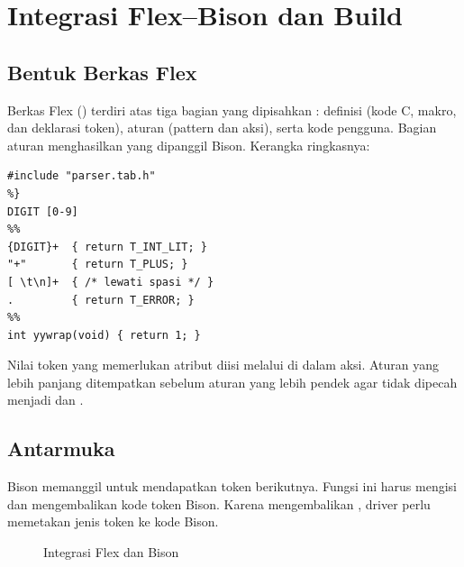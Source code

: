 \section{Integrasi Flex--Bison dan Build}
\label{sec:ch13-integrasi}

\subsection{Bentuk Berkas Flex}

Berkas Flex () terdiri atas tiga bagian yang dipisahkan
\code{\%\%}: definisi (kode C, makro, dan deklarasi token), aturan
(pattern dan aksi), serta kode pengguna. Bagian aturan menghasilkan
 yang dipanggil Bison. Kerangka ringkasnya:

\begin{lstlisting}[language=Flex]
%{
#include "parser.tab.h"
%}
DIGIT [0-9]
%%
{DIGIT}+  { return T_INT_LIT; }
"+"       { return T_PLUS; }
[ \t\n]+  { /* lewati spasi */ }
.         { return T_ERROR; }
%%
int yywrap(void) { return 1; }
\end{lstlisting}

Nilai token yang memerlukan atribut diisi melalui  di
dalam aksi. Aturan yang lebih panjang ditempatkan sebelum aturan yang
lebih pendek agar \code{<=} tidak dipecah menjadi \code{<} dan
\code{=}.

\subsection{Antarmuka }

Bison memanggil  untuk mendapatkan token berikutnya.
Fungsi ini harus mengisi  dan mengembalikan kode token
Bison. Karena  mengembalikan , driver
perlu memetakan jenis token ke kode Bison.

\begin{figure}[H]
\centering
{}
\caption{Integrasi Flex dan Bison}
\label{fig:ch13-integrasi}
\end{figure}

